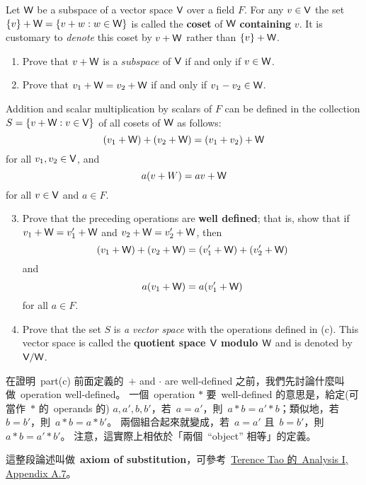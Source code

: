 \begin{exercise} \label{exercise 1.3.31}
Let \(\textsf{W}\) be a subspace of a vector space \(\textsf{V}\) over a field \(F\).
For any \(v \in \textsf{V}\) the set \(\{v\} + \textsf{W} = \{v + w : w \in \textsf{W}\}\) is called the \textbf{coset} of \(\textsf{W}\) \textbf{containing} \(v\).
It is customary to \emph{denote} this coset by \(v + \textsf{W}\) rather than \(\{v\} + \textsf{W}\).
\begin{enumerate}
    \item Prove that \(v + \textsf{W}\) is a \(subspace\) of \(\textsf{V}\) if and only if \(v \in \textsf{W}\).
    \item Prove that \(v_1 + \textsf{W} = v_2 + \textsf{W}\) if and only if \(v_1 - v_2 \in \textsf{W}\).
\end{enumerate}
Addition and scalar multiplication by scalars of \(F\) can be defined in the collection \(S = \{v + \textsf{W}: v \in \textsf{V}\}\) of all cosets of \(\textsf{W}\) as follows:
\[
    (v_1 + \textsf{W}) + (v_2 + \textsf{W}) = (v_1 + v_2) + \textsf{W}
\]
for all \(v_1, v_2 \in \textsf{V}\), and
\[
    a(v + W) = av + \textsf{W}
\]
for all \(v \in \textsf{V}\) and \(a \in F\).
\begin{enumerate}
    \setcounter{enumi}{2}
    \item Prove that the preceding operations are \textbf{well defined};
        that is, show that if \(v_1 + \textsf{W} = v_1' + \textsf{W}\) and \(v_2 + \textsf{W} = v_2' + \textsf{W}\), then
        \[
            (v_1 + \textsf{W}) + (v_2 + \textsf{W}) = (v_1' + \textsf{W}) + (v_2' + \textsf{W})
        \]
        and
        \[
            a(v_1 + \textsf{W}) = a(v_1' + \textsf{W})
        \]
        for all \(a \in F\).
    \item Prove that the set \(S\) is \emph{a vector space} with the operations defined in (c).
    This vector space is called the \textbf{quotient space \(\textsf{V}\) modulo \(\textsf{W}\)} and is denoted by \(\textsf{V} / \textsf{W}\).
\end{enumerate}
\end{exercise}

\begin{note}
在證明\ part(c) 前面定義的\ \(+\) and \(\cdot\) are well-defined 之前，我們先討論什麼叫做\ operation well-defined。
一個\ operation \(*\) 要\ well-defined 的意思是，給定(可當作\ \(*\) 的\ operands 的) \(a, a', b, b'\)，若\ \(a = a'\)，則\ \(a * b = a' * b\)；類似地，若\ \(b = b'\)，則\ \(a * b = a * b'\)。
兩個組合起來就變成，若\ \(a = a'\) 且\ \(b = b'\)，則\ \(a * b = a' * b'\)。
注意，這實際上相依於「兩個\ ``object'' 相等」的定義。

這整段論述叫做\ \textbf{axiom of substitution}，可參考\ \href{https://link.springer.com/book/10.1007/978-981-10-1789-6}{Terence Tao 的\ Analysis I, Appendix A.7}。
\end{note}

